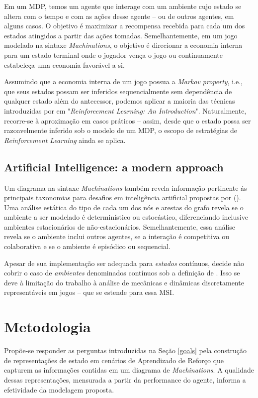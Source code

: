 \documentclass[10pt,a4paper]{article}
\begin{document}
Em um MDP, temos um agente que interage com um ambiente cujo estado se altera com o tempo e com as ações desse agente -- ou de outros agentes, em alguns casos. O objetivo é maximizar a recompensa recebida para cada um dos estados atingidos a partir das ações tomadas. Semelhantemente, em um jogo modelado na sintaxe \textit{Machinations}, o objetivo é direcionar a economia interna para um estado terminal onde o jogador vença o jogo ou continuamente estabeleça uma economia favorável a si.

Assumindo que a economia interna de um jogo possua a \textit{Markov property}, i.e., que seus estados possam ser inferidos sequencialmente sem dependência de qualquer estado além do antecessor, podemos aplicar a maioria das técnicas introduzidas por \citeauthor{rl} em "\textit{Reinforcement Learning: An Introduction}". Naturalmente, recorre-se à aproximação em casos práticos -- assim, desde que o estado possa ser razoavelmente inferido sob o modelo de um MDP, o escopo de estratégias de \textit{Reinforcement Learning} ainda se aplica.

\subsection{Artificial Intelligence: a modern approach}
Um diagrama na sintaxe \textit{Machinations} também revela informação pertinente ás principais taxonomias para desafios em inteligência artificial propostas por \citeauthor{ai} (\citeyear{ai}). Uma análise estática do tipo de cada um dos nós e arestas do grafo revela se o ambiente a ser modelado é determinístico ou estocástico, diferenciando inclusive ambientes estacionários de não-estacionários. Semelhantemente, essa análise revela se o ambiente inclui outros agentes, se a interação é competitiva ou colaborativa e se o ambiente é episódico ou sequencial.

Apesar de sua implementação ser adequada para \textit{estados} contínuos, \citeauthor{machinations} decide não cobrir o caso de \textit{ambientes} denominados contínuos sob a definição de \citeauthor{ai}. Isso se deve à limitação do trabalho à análise de mecânicas e dinâmicas discretamente representáveis em jogos -- que se estende para essa MSI.

\section{Metodologia}
\label{methodology}

Propõe-se responder as perguntas introduzidas na Seção \ref{goals} pela construção de representações de estado em cenários de Aprendizado de Reforço que capturem as informações contidas em um diagrama de \textit{Machinations}. A qualidade dessas representações, mensurada a partir da performance do agente, informa a efetividade da modelagem proposta.
\end{document}
